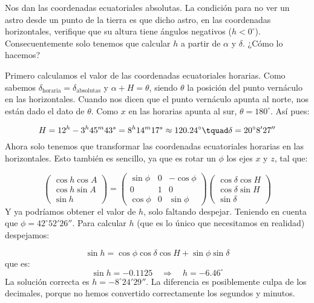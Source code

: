 	Nos dan las coordenadas ecuatoriales absolutas. La condición para no ver un astro desde un punto de la tierra es que dicho astro, en las coordenadas horizontales, verifique que su altura tiene ángulos negativos ($h<0^\circ$). Consecuentemente solo tenemos que calcular $h$ a partir de $\alpha$ y $\delta$. ¿Cómo lo hacemos?
	
	Primero calculamos el valor de las coordenadas ecuatoriales horarias. Como sabemos $\delta_{\mathrm{horaria}} = \delta_{\mathrm{absolutas}}$ y $\alpha+H=\theta$, siendo $\theta$ la posición del punto vernáculo en las horizontales. Cuando nos dicen que el punto vernáculo apunta al norte, nos están dado el dato de $\theta$. Como $x$ en las horarias apunta al sur, $\theta=180^\circ$. Así pues:

	\begin{equation}
		H = 12^h - 3^h 45^m 43^s = 8^h 14^m 17^s \approx 120.24^\circ  \tquad \delta=20^\circ 8'27''
	\end{equation}
	Ahora solo tenemos que transformar las coordenadas ecuatoriales horarias en las horizontales. Esto también es sencillo, ya que es rotar un $\phi$ los ejes $x$ y $z$, tal que:
	
	\begin{equation}
		\begin{pmatrix}
			\cos h \cos A \\
			\cos h \sin A \\
			\sin h
		\end{pmatrix} =\begin{pmatrix}
			\sin \phi & 0 &- \cos \phi \\
			0 & 1 & 0 \\
			 \cos \phi & 0 & \sin \phi
		\end{pmatrix}
		\begin{pmatrix}
			\cos \delta \cos H \\
			\cos \delta \sin H \\
			\sin \delta
		\end{pmatrix}
	\end{equation}
	Y ya podríamos obtener el valor de $h$, solo faltando despejar. Teniendo en cuenta que $\phi=42^\circ52'26''$. Para calcular $h$ (que es lo único que necesitamos en realidad) despejamos:

	\begin{equation}
		\sin h = \cos \phi \cos \delta \cos H + \sin \phi \sin \delta
	\end{equation}
	que es:
	\begin{equation}
		\sin h = -0.1125 \quad \Longrightarrow \quad h = -6.46^\circ
	\end{equation}
	La solución correcta es $h = -8^\circ24'29''$. La diferencia es posiblemente culpa de los decimales, porque no hemos convertido correctamente los segundos y minutos.
